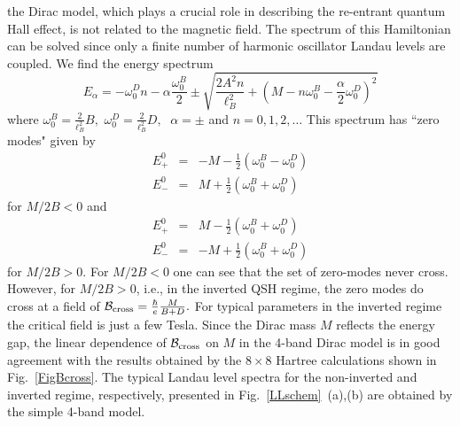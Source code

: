 \documentclass{article}
\begin{document}
the Dirac model, which plays a crucial role in describing the
re-entrant quantum Hall effect, is not related to the magnetic
field. The spectrum of this Hamiltonian can be solved since only a
finite number of harmonic oscillator Landau levels are coupled. We
find the energy spectrum\begin{equation} E_{\alpha}=-\omega_{0}^{D}
n -\alpha \frac{\omega_0^{B}}{2}\pm \sqrt{\frac{2A^2
n}{\ell_{B}^2}+(M-n\omega_0^{B}-\frac{\alpha}{2}\omega_{0}^{D})^2}
\end{equation}\noindent where $\omega_{0}^{B}=\frac{2}{\ell_{B}^2}B,$
$\omega_{0}^{D}=\frac{2}{\ell_{B}^2}D,\;$ $\alpha=\pm$ and
$n=0,1,2,\ldots$ This spectrum has ``zero modes" given by
\begin{eqnarray}
E^{0}_{+}&=&-M-\frac{1}{2}(\omega_{0}^{B}-\omega_{0}^D )\\
E^{0}_{-}&=&M+\frac{1}{2}(\omega_{0}^{B}+\omega_{0}^D )
\end{eqnarray}\noindent for $M/2B<0$ and
\begin{eqnarray}
E^{0}_{+}&=&M-\frac{1}{2}(\omega_{0}^{B}+\omega_{0}^D )\\
E^{0}_{-}&=&-M+\frac{1}{2}(\omega_{0}^{B}+\omega_{0}^D )
\end{eqnarray}\noindent for $M/2B>0.$ For $M/2B<0$ one can see
that the  set of zero-modes never cross. However, for $M/2B>0$,
i.e., in the inverted QSH regime, the zero modes do cross at a field
of ${\cal{B}}_{\rm cross}= \frac{\hbar}{e}\frac{M}{B+D}.$ For
typical parameters in the inverted
regime~\cite{Bernevig2006d,hughes2007} the critical field is just a
few Tesla. Since the Dirac mass $M$ reflects the energy gap, the
linear dependence of ${\cal{B}}_{\rm cross}$ on $M$ in the 4-band
Dirac model is in good agreement with the results obtained by the
$8\times8$ Hartree calculations shown in Fig.~\ref{FigBcross}. The
typical Landau level spectra for the non-inverted and inverted
regime, respectively, presented in Fig.~\ref{LLschem}~(a),(b) are
obtained by the simple 4-band model.
\end{document}
